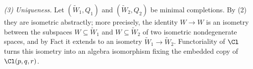 \emph{(3) Uniqueness.} Let $(\widetilde W_1, Q_1)$ and $(\widetilde W_2, Q_2)$ be minimal completions. By (2) they are isometric abstractly; more precisely, the identity $W \to W$ is an isometry between the subspaces $W \subseteq \widetilde W_1$ and $W \subseteq \widetilde W_2$ of two isometric nondegenerate spaces, and by Fact  it extends to an isometry $\widetilde W_1 \to \widetilde W_2$. Functoriality of $\Cl$ turns this isometry into an algebra isomorphism fixing the embedded copy of $\Cl(p,q,r)$.
